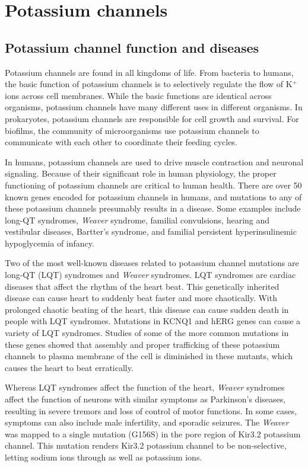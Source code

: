 \section{Potassium channels}
\subsection{Potassium channel function and diseases}
Potassium channels are found in all kingdoms of life. From bacteria to humans, the basic function of potassium channels is to selectively regulate the flow of K$^{+}$ ions across cell membranes. While the basic functions are identical across organisms, potassium channels have many different uses in different organisms. In prokaryotes, potassium channels are responsible for cell growth and survival. For biofilms, the community of microorganisms use potassium channels to communicate with each other to coordinate their feeding cycles. \cite{prindle2015,liu2015} 

In humans, potassium channels are used to drive muscle contraction and neuronal signaling. Because of their significant role in human physiology, the proper functioning of potassium channels are critical to human health. There are over 50 known genes encoded for potassium channels in humans, and mutations to any of these potassium channels presumably results in a disease. \cite{shieh2000} Some examples include long-QT syndromes, \textit{Weaver} syndrome, familial convulsions, hearing and vestibular diseases, Bartter's syndrome, and familial persistent hyperinsulinemic hypoglycemia of infancy.

Two of the most well-known diseases related to potassium channel mutations are long-QT (LQT) syndromes and \textit{Weaver} syndromes. LQT syndromes are cardiac diseases that affect the rhythm of the heart beat. This genetically inherited disease can cause heart to suddenly beat faster and more chaotically. With prolonged chaotic beating of the heart, this disease can cause sudden death in people with LQT syndromes. Mutations in KCNQ1 and hERG genes can cause a variety of LQT syndromes. \cite{shieh2000} Studies of some of the more common mutations in these genes showed that assembly and proper trafficking of these potassium channels to plasma membrane of the cell is diminished in these mutants, which causes the heart to beat erratically. 

Whereas LQT syndromes affect the function of the heart, \textit{Weaver} syndromes affect the function of neurons with similar symptoms as Parkinson's diseases, resulting in severe tremors and loss of control of motor functions. In some cases, symptoms can also include male infertility, and sporadic seizures. The \textit{Weaver} was mapped to a single mutation (G156S) in the pore region of Kir3.2 potassium channel. This mutation renders Kir3.2 potassium channel to be non-selective, letting sodium ions through as well as potassium ions.


